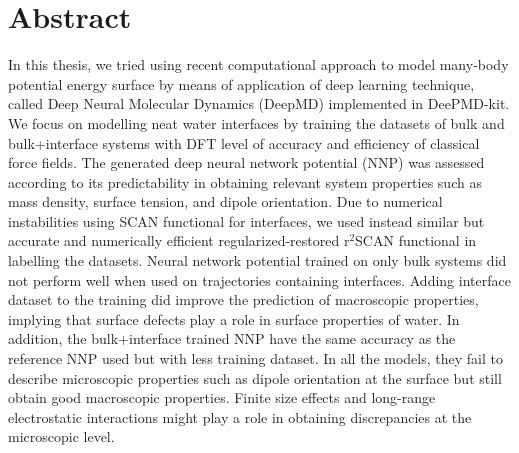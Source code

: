 \chapter*{Abstract}


In this thesis, we tried using recent computational approach to model many-body potential energy surface by means of application of deep learning technique,  called Deep Neural Molecular Dynamics (DeepMD) implemented in DeePMD-kit. We focus on modelling  neat water interfaces by training the datasets of bulk and bulk+interface systems with DFT level of accuracy  and efficiency of classical force fields. The generated deep neural network potential (NNP) was assessed according to its predictability in obtaining relevant system properties such as mass density, surface tension, and dipole orientation. Due to numerical instabilities using SCAN functional for interfaces, we used instead  similar  but accurate and numerically efficient regularized-restored r$^2$SCAN functional in labelling the datasets. Neural network potential trained on only bulk
systems did not perform well when used on trajectories containing interfaces. Adding interface dataset to the training
did improve the prediction  of macroscopic properties, implying that surface defects
play a role in surface properties of water. In addition, the bulk+interface trained NNP have the same accuracy as the reference NNP used but with less training dataset. In all the models, they fail to describe microscopic properties such as dipole orientation at the surface but still obtain good macroscopic properties.  Finite size effects  and  long-range electrostatic interactions might play a role in obtaining  discrepancies at the microscopic level.
